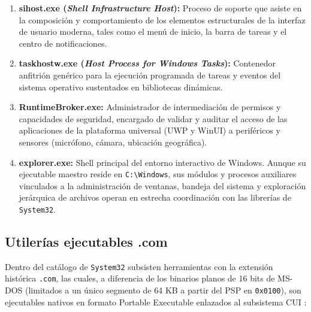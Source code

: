 \documentclass[12pt]{article}
\begin{document}
\begin{enumerate}[leftmargin=*]
    \item \textbf{sihost.exe (\textit{Shell Infrastructure Host}):} Proceso de soporte que asiste en la composición y comportamiento de los elementos estructurales de la interfaz de usuario moderna, tales como el menú de inicio, la barra de tareas y el centro de notificaciones.
    
    \item \textbf{taskhostw.exe (\textit{Host Process for Windows Tasks}):} Contenedor anfitrión genérico para la ejecución programada de tareas y eventos del sistema operativo sustentados en bibliotecas dinámicas.
    
    \item \textbf{RuntimeBroker.exe:} Administrador de intermediación de permisos y capacidades de seguridad, encargado de validar y auditar el acceso de las aplicaciones de la plataforma universal (UWP y WinUI) a periféricos y sensores (micrófono, cámara, ubicación geográfica).
    
    \item \textbf{explorer.exe:} Shell principal del entorno interactivo de Windows. Aunque su ejecutable maestro reside en \texttt{C:\textbackslash Windows}, sus módulos y procesos auxiliares vinculados a la administración de ventanas, bandeja del sistema y exploración jerárquica de archivos operan en estrecha coordinación con las librerías de \texttt{System32}.
\end{enumerate}

\subsection{Utilerías ejecutables .com}\label{sec:utileriasComSystem32}

Dentro del catálogo de \texttt{System32} subsisten herramientas con la extensión histórica \texttt{.com}, las cuales, a diferencia de los binarios planos de 16 bits de MS-DOS (limitados a un único segmento de 64 KB a partir del PSP en \texttt{0x0100}), son ejecutables nativos en formato Portable Executable enlazados al subsistema CUI \parencite[\S 21.2, p.\ 1037]{deitel2004operating}:
\end{document}
